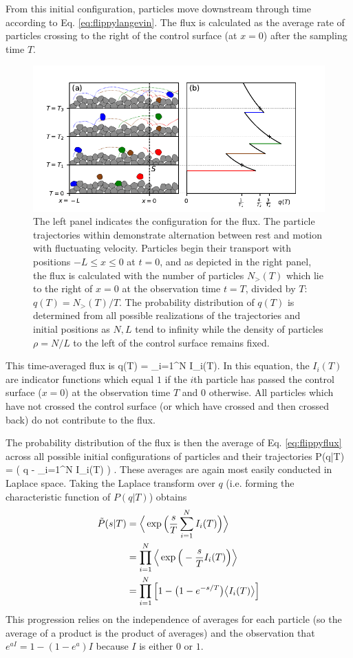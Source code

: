 From this initial configuration, particles move downstream through time according to Eq. \ref{eq:flippylangevin}.
The flux is calculated as the average rate of particles crossing to the right of the control surface (at $x=0$) after the sampling time $T$.
\begin{figure}
	\centerline{\includegraphics{./figures/ch2/figure1.pdf}}
	\caption{The left panel indicates the configuration for the flux. The particle trajectories within demonstrate alternation between rest and motion with fluctuating velocity. Particles begin their transport with positions $-L\leq x \leq 0$ at $t=0$, and as depicted in the right panel, the flux is calculated with the number of particles $N_>(T)$ which lie to the right of $x=0$ at the observation time $t=T$, divided by $T$: $q(T) = N_>(T)/T$. The probability distribution of $q(T)$ is determined from all possible realizations of the trajectories and initial positions as $N,L$ tend to infinity while the density of particles $\rho=N/L$ to the left of the control surface remains fixed.}
	\label{fig:flipflopfig1}
\end{figure}
This time-averaged flux is
\be q(T) = \sum_{i=1}^N I_i(T). \label{eq:flippyflux} \ee
In this equation, the $I_i(T)$ are indicator functions which equal $1$ if the $i$th particle has passed the control surface ($x=0$) at the observation time $T$ and $0$ otherwise.
All particles which have not crossed the control surface (or which have crossed and then crossed back) do not contribute to the flux.

The probability distribution of the flux is then the average of Eq. \ref{eq:flippyflux} across all possible initial configurations of particles and their trajectories
\be P(q|T) = \Big \bra \delta\Big( q - \sum_{i=1}^N I_i(T) \Big) \Big\ket. \ee
These averages are again most easily conducted in Laplace space. 
Taking the Laplace transform over $q$ (i.e. forming the characteristic function of $P(q|T)$) obtains
\begin{align} \tilde{P}(s|T) &=  \Big\langle \exp\Big(\frac{s}{T}\sum_{i=1}^N I_i(T)\Big)\Big\rangle \\
	&=  \prod_{i=1}^N \Big\langle \exp\Big(-\frac{s}{T}I_i(T)\Big)\Big\rangle \\
	&= \prod_{i=1}^N \Big[1-\big(1-e^{-s/T}\big)\big\langle I_i(T) \big\rangle \Big] \label{eq:flippycharacteristic}\end{align}
This progression relies on the independence of averages for each particle (so the average of a product is the product of averages) and the observation that  $e^{a I} = 1-(1-e^a)I$ because $I$ is either $0$ or $1$.

